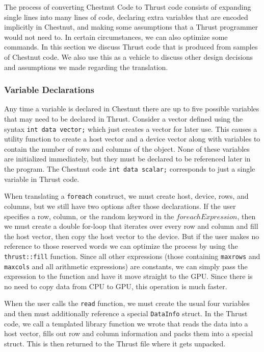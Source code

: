 \documentclass[twocolumn]{article}
\renewcommand{\|}{\origbar} %
\newcommand{\code}[1]{\texttt{#1}}
\begin{document}
The process of converting Chestnut Code to Thrust code consists of expanding single lines into many lines of code, declaring extra variables that are encoded implicitly in Chestnut, and making some assumptions that a Thrust programmer would not need to. In certain circumstances, we can also optimize some commands. In this section we discuss Thrust code that is produced from samples of Chestnut code. We also use this as a vehicle to discuss other design decisions and assumptions we made regarding the translation.

\subsubsection{Variable Declarations}

Any time a variable is declared in Chestnut there are up to five possible variables that may need to be declared in Thrust. Consider a vector defined using the syntax \code{int data vector;} which just creates a vector for later use. This causes a utility function to create a host vector and a device vector along with variables to contain the number of rows and columns of the object. None of these variables are initialized immediately, but they must be declared to be referenced later in the program. The Chestnut code \code{int data scalar;} corresponds to just a single variable in Thrust code.

When translating a \code{foreach} construct, we must create host, device, rows, and columns, but we still have two options after those declarations. If the user specifies a row, column, or the random keyword in the $foreachExpression$, then we must create a double for-loop that iterates over every row and column and fill the host vector, then copy the host vector to the device. But if the user makes no reference to those reserved words we can optimize the process by using the \code{thrust::fill} function. Since all other expressions (those containing \code{maxrows} and \code{maxcols} and all arithmetic expressions) are constants, we can simply pass the expression to the function and have it move straight to the GPU. Since there is no need to copy data from CPU to GPU, this operation is much faster.

When the user calls the \code{read} function, we must create the usual four variables and then must additionally reference a special \code{DataInfo} struct. In the Thrust code, we call a templated library function we wrote that reads the data into a host vector, fills out row and column information and packs them into a special struct. This is then returned to the Thrust file where it gets unpacked.
\end{document}
